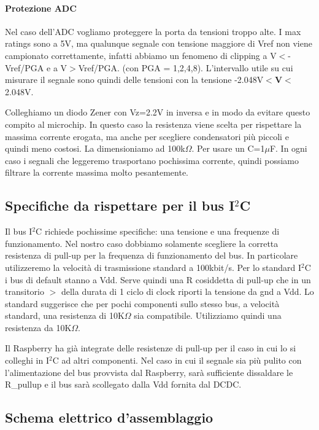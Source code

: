 \documentclass[10pt]{article}
\begin{document}
			\paragraph{Protezione ADC}
				Nel caso dell'ADC vogliamo proteggere la porta da tensioni troppo alte. I max ratings sono a 5V, ma qualunque segnale con tensione maggiore di Vref non viene campionato correttamente,
				infatti abbiamo un fenomeno di clipping a V\(<\)-Vref/PGA e a V\(>\)Vref/PGA. (con PGA = 1,2,4,8).
				L'intervallo utile su cui misurare il segnale sono quindi delle tensioni con la tensione -2.048V\(<\)\textbf{V}\(<\)2.048V.
				
				Colleghiamo un diodo Zener con Vz=2.2V in inversa e in modo da evitare questo compito al microchip.
				In questo caso la resistenza viene scelta per rispettare la massima corrente erogata, ma anche per scegliere condensatori più piccoli e quindi meno costosi.
				La dimensioniamo ad 100k\(\Omega\). Per usare un C=1\(\mu\)F. In ogni caso i segnali che leggeremo trasportano pochissima corrente, quindi possiamo filtrare la corrente massima molto pesantemente.


	\subsection{Specifiche da rispettare per il bus I\(^2\)C}

		Il bus I\(^2\)C richiede pochissime specifiche: una tensione e una frequenze di funzionamento.
		Nel nostro caso dobbiamo solamente scegliere la corretta resistenza di pull-up per la frequenza di funzionamento del bus.
		In particolare utilizzeremo la velocità di trasmissione standard a 100kbit/s.
		Per lo standard I\(^2\)C i bus di default stanno a Vdd. Serve quindi una R cosiddetta di pull-up che in un transitorio \(>\) della durata di 1 ciclo di clock riporti la tensione da gnd a Vdd.
		Lo standard suggerisce che per pochi componenti sullo stesso bus, a velocità standard, una resistenza di 10K\(\Omega\) sia compatibile.
		Utilizziamo quindi una resistenza da 10K\(\Omega\).

		Il Raspberry ha già integrate delle resistenze di pull-up per il caso in cui lo si colleghi in I\(^2\)C ad altri componenti.
		Nel caso in cui il segnale sia più pulito con l'alimentazione del bus provvista dal Raspberry, sarà sufficiente dissaldare le R\_pullup e il bus sarà scollegato dalla Vdd fornita dal DCDC.


	\subsection{Schema elettrico d'assemblaggio}
\end{document}
